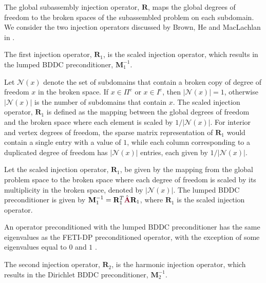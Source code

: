 The global subassembly injection operator, $\mathbf{R}$, maps the global degrees of freedom to the broken spaces of the subassembled problem on each subdomain.
We consider the two injection operators discussed by Brown, He and MacLachlan in \cite{brown2019local}.

The first injection operator, $\mathbf{R}_1$, is the scaled injection operator, which results in the lumped BDDC preconditioner, $\mathbf{M}^{-1}_1$.

Let $\mathcal{N} \left( x \right)$ denote the set of subdomains that contain a broken copy of degree of freedom $x$ in the broken space.
If $x \in \Pi^e$ or $x \in I^e$, then $\lvert \mathcal{N} \left( x \right) \rvert = 1$, otherwise $\lvert \mathcal{N} \left( x \right) \rvert$ is the number of subdomains that contain $x$.
The scaled injection operator, $\mathbf{R}_1$ is defined as the mapping between the global degrees of freedom and the broken space where each element is scaled by $1 / \lvert \mathcal{N} \left( x \right) \rvert$.
For interior and vertex degrees of freedom, the sparse matrix representation of $\mathbf{R}_1$ would contain a single entry with a value of $1$, while each column corresponding to a duplicated degree of freedom has $\lvert \mathcal{N} \left( x \right) \rvert$ entries, each given by $1 / \lvert \mathcal{N} \left( x \right) \rvert$.

\begin{definition}
Let the scaled injection operator, $\mathbf{R}_1$, be given by the mapping from the global problem space to the broken space where each degree of freedom is scaled by its multiplicity in the broken space, denoted by $\lvert \mathcal{N} \left( x \right) \rvert$.
The lumped BDDC preconditioner is given by $\mathbf{M}^{-1}_1 = \mathbf{R}_1^T \hat{\color{burgundy}\mathbf{A}} \mathbf{R}_1$, where $\mathbf{R}_1$ is the scaled injection operator.
\label{def:lumpedbddc}
\end{definition}

An operator preconditioned with the lumped BDDC preconditioner has the same eigenvalues as the FETI-DP preconditioned operator, with the exception of some eigenvalues equal to $0$ and $1$ \cite{li2007use}.

The second injection operator, $\mathbf{R}_2$, is the harmonic injection operator, which results in the Dirichlet BDDC preconditioner, $\mathbf{M}^{-1}_2$.

